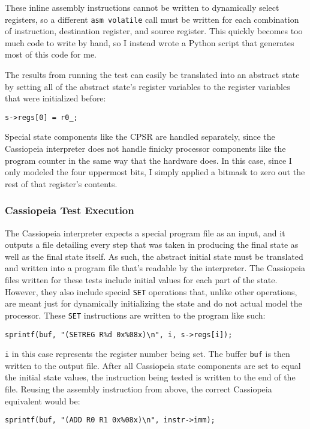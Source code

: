 \documentclass[letterpaper,12pt]{article}
\begin{document}
These inline assembly instructions cannot be written to dynamically select registers, so a different \texttt{asm volatile} call must be written for each combination of instruction, destination register, and source register. This quickly becomes too much code to write by hand, so I instead wrote a Python script that generates most of this code for me.

The results from running the test can easily be translated into an abstract state by setting all of the abstract state's register variables to the register variables that were initialized before:

\texttt{s->regs[0] = r0\_;}

Special state components like the CPSR are handled separately, since the Cassiopeia interpreter does not handle finicky processor components like the program counter in the same way that the hardware does. In this case, since I only modeled the four uppermost bits, I simply applied a bitmask to zero out the rest of that register's contents.

\subsubsection{Cassiopeia Test Execution}

The Cassiopeia interpreter expects a special program file as an input, and it outputs a file detailing every step that was taken in producing the final state as well as the final state itself. As such, the abstract initial state must be translated and written into a program file that's readable by the interpreter. The Cassiopeia files written for these tests include initial values for each part of the state. However, they also include special \texttt{SET} operations that, unlike other operations, are meant just for dynamically initializing the state and do not actual model the processor. These \texttt{SET} instructions are written to the program like such:

\texttt{sprintf(buf, "(SETREG R\%d 0x\%08x)\textbackslash n", i, s->regs[i]);}

\texttt{i} in this case represents the register number being set. The buffer \texttt{buf} is then written to the output file. After all Cassiopeia state components are set to equal the initial state values, the instruction being tested is written to the end of the file. Reusing the assembly instruction from above, the correct Cassiopeia equivalent would be:

\texttt{sprintf(buf, "(ADD R0 R1 0x\%08x)\textbackslash n", instr->imm);}
\end{document}
